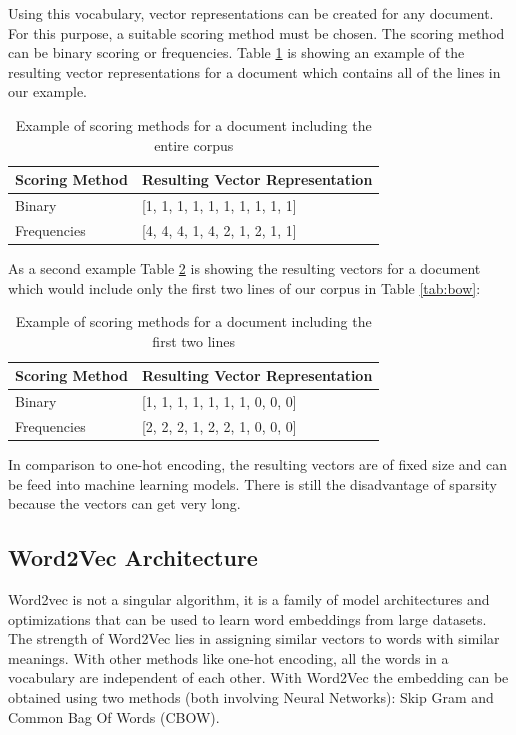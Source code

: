 Using this vocabulary, vector representations can be created for any document. For this purpose, a suitable scoring method must be chosen. The scoring method can be binary scoring or frequencies. Table \ref{tab:scoring1} is showing an example of the resulting vector representations for a document which contains all of the lines in our example.

\begin{table}[H]
	\centering
	\begin{tabular}{ll}
		\hline
		\textbf{Scoring Method} & \textbf{Resulting Vector Representation}                                         \\ \hline
		Binary & [1, 1, 1, 1, 1, 1, 1, 1, 1, 1] \\ \hline
		Frequencies & [4, 4, 4, 1, 4, 2, 1, 2, 1, 1] \\ \hline
	\end{tabular}
	\caption{Example of scoring methods for a document including the entire corpus}
	\label{tab:scoring1}
\end{table}

As a second example Table \ref{tab:scoring2} is showing the resulting vectors for a document which would include only the first two lines of our corpus in Table \ref{tab:bow}:

\begin{table}[H]
	\centering
	\begin{tabular}{ll}
		\hline
		\textbf{Scoring Method} & \textbf{Resulting Vector Representation}                                         \\ \hline
		Binary & [1, 1, 1, 1, 1, 1, 1, 0, 0, 0] \\ \hline
		Frequencies & [2, 2, 2, 1, 2, 2, 1, 0, 0, 0] \\ \hline
	\end{tabular}
	\caption{Example of scoring methods for a document including the first two lines}
	\label{tab:scoring2}
\end{table}

In comparison to one-hot encoding, the resulting vectors are of fixed size and can be feed into machine learning models. There is still the disadvantage of sparsity because the vectors can get very long.

\subsection{Word2Vec Architecture}
Word2vec is not a singular algorithm, it is a family of model architectures and optimizations that can be used to learn word embeddings from large datasets. The strength of Word2Vec lies in assigning similar vectors to words with similar meanings. With other methods like one-hot encoding, all the words in a vocabulary are independent of each other. With Word2Vec the embedding can be obtained using two methods (both involving Neural Networks): Skip Gram and Common Bag Of Words (CBOW).

